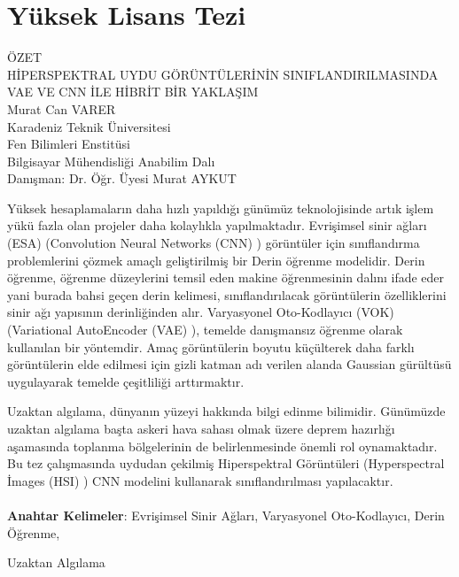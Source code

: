 \chapter*{\normalfont Yüksek Lisans Tezi}


\begin{center}
\vspace{-1.2cm}
    ÖZET\\
    \vspace{0.33cm}
    HİPERSPEKTRAL UYDU GÖRÜNTÜLERİNİN SINIFLANDIRILMASINDA\\ VAE VE CNN İLE HİBRİT BİR YAKLAŞIM\\
    \vspace{0.33cm}
    Murat Can VARER\\
    \vspace{0.33cm}
    Karadeniz Teknik Üniversitesi\\
    Fen Bilimleri Enstitüsi\\
    Bilgisayar Mühendisliği Anabilim Dalı\\
    Danışman: Dr. Öğr. Üyesi Murat AYKUT
\end{center}
\vspace{0.5cm}
Yüksek hesaplamaların daha hızlı yapıldığı günümüz teknolojisinde artık işlem yükü fazla olan projeler daha kolaylıkla yapılmaktadır. Evrişimsel sinir ağları (ESA) (Convolution Neural Networks (CNN) ) görüntüler için sınıflandırma problemlerini çözmek amaçlı geliştirilmiş bir Derin öğrenme modelidir.
Derin öğrenme, öğrenme düzeylerini temsil eden makine öğrenmesinin dalını ifade eder yani burada bahsi geçen derin kelimesi, sınıflandırılacak görüntülerin özelliklerini sinir ağı yapısının derinliğinden alır. Varyasyonel Oto-Kodlayıcı (VOK) (Variational AutoEncoder (VAE) ), temelde danışmansız öğrenme olarak kullanılan bir yöntemdir. Amaç görüntülerin boyutu küçülterek daha farklı görüntülerin elde edilmesi için gizli katman adı verilen alanda Gaussian gürültüsü uygulayarak temelde çeşitliliği arttırmaktır. 

Uzaktan algılama, dünyanın yüzeyi hakkında bilgi edinme bilimidir. Günümüzde uzaktan algılama başta askeri hava sahası olmak üzere deprem hazırlığı aşamasında toplanma bölgelerinin de belirlenmesinde önemli rol oynamaktadır. Bu tez çalışmasında uydudan çekilmiş Hiperspektral Görüntüleri (Hyperspectral İmages (HSI) ) CNN modelini kullanarak sınıflandırılması yapılacaktır.
\\
\\
\textbf{Anahtar Kelimeler}: Evrişimsel Sinir Ağları, Varyasyonel Oto-Kodlayıcı, Derin Öğrenme, 

                            \hspace{2.7cm}Uzaktan Algılama

